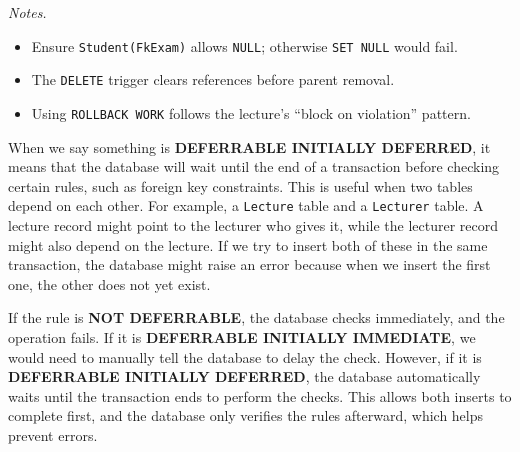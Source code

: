 \documentclass{article}
\begin{document}
\begin{subtasks}
\textit{Notes.}
\begin{itemize}
  \item Ensure \texttt{Student(FkExam)} allows \texttt{NULL}; otherwise \texttt{SET NULL} would fail.
  \item The \texttt{DELETE} trigger clears references before parent removal.
  \item Using \texttt{ROLLBACK WORK} follows the lecture’s “block on violation” pattern.
\end{itemize}

\end{subtasks}


\task{}

\task{}
When we say something is \textbf{DEFERRABLE INITIALLY DEFERRED}, it means that the database will wait until the end of a transaction before checking certain rules, such as foreign key constraints. This is useful when two tables depend on each other. For example, a \texttt{Lecture} table and a \texttt{Lecturer} table. A lecture record might point to the lecturer who gives it, while the lecturer record might also depend on the lecture. If we try to insert both of these in the same transaction, the database might raise an error because when we insert the first one, the other does not yet exist.


If the rule is \textbf{NOT DEFERRABLE}, the database checks immediately, and the operation fails. If it is \textbf{DEFERRABLE INITIALLY IMMEDIATE}, we would need to manually tell the database to delay the check. However, if it is \textbf{DEFERRABLE INITIALLY DEFERRED}, the database automatically waits until the transaction ends to perform the checks. This allows both inserts to complete first, and the database only verifies the rules afterward, which helps prevent errors.
\end{document}
